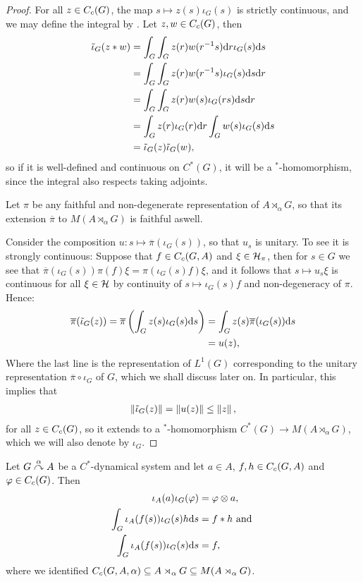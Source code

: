 \begin{proof}
For all $z \in C_c(G)$, the map $s \mapsto z(s) \iota_G(s)$ is strictly continuous, and we may define the integral by . Let $z,w \in C_c(G)$, then
\begin{align*}
	\tilde \iota_G(z \ast w) &= \int_G \int_G z(r)w(r^{-1}s) \mathrm{d} r \iota_G(s) \mathrm{d} s \\
	&= \int_G \int_G z(r) w(r^{-1}s) \iota_G(s) \mathrm{d} s \mathrm{d} r\\
	&= \int_G \int_G z(r) w(s) \iota_G(rs) \mathrm{d} s \mathrm{d} r\\
	&= \int_G z(r) \iota_G(r) \mathrm{d} r \int_G w(s) \iota_G(s) \mathrm{d} s \\
	&= \tilde \iota_G(z) \tilde \iota_G(w),
\end{align*}
so if it is well-defined and continuous on $C^*(G)$, it will be a $^*$-homomorphism, since the integral also respects taking adjoints. 

Let $\pi$ be any faithful and non-degenerate representation of $A \rtimes_\alpha G$, so that its extension $\overline \pi $ to $M(A \rtimes_ \alpha G)$ is faithful aswell.

Consider the composition $u \colon s \mapsto \overline{\pi}( \iota_G(s))$, so that $u_s$ is unitary. To see it is strongly continuous: Suppose that $f \in C_c(G,A)$ and $\xi \in \mathcal{H}_\pi$, then for $s \in G$ we see that $\overline{ \pi} (\iota_G(s)) \pi(f) \xi = \pi(\iota_G(s) f) \xi$, and it follows that  $s \mapsto u_s \xi$ is continuous for all $\xi \in \mathcal{H}$ by continuity of $s \mapsto \iota_G(s)f$ and non-degeneracy of $\pi$. Hence:
\begin{align*}
\overline \pi(\tilde \iota_G(z)) = \overline \pi \left(  \int_G z(s) \iota_G(s) \mathrm{d} s \right) &=\int_G z(s) \overline \pi(\iota_G(s)) \mathrm{d} s \\
&= u(z),
\end{align*}
Where the last line is the representation of $L^1(G)$ corresponding to the unitary representation $\overline \pi \circ \iota_G$ of $G$, which we shall discuss later on. In particular, this implies that
\begin{align}
	\left\lVert \tilde \iota_G(z)\right\rVert = \left\lVert u(z)\right\rVert \leq \left\lVert z \right\rVert,
\end{align}
for all $z \in C_c(G)$, so it extends to a $^*$-homomorphism $C^*(G) \to M(A \rtimes_\alpha G)$, which we will also denote by $\iota_G$.
\end{proof}
\begin{corollary}
Let $G \stackrel{\alpha}{\curvearrowright} A$ be a $C^*$-dynamical system and let $a \in A$, $f,h \in C_c(G,A)$ and $\varphi \in C_c(G)$. Then
\begin{align*}
\iota_A(a) \iota_G(\varphi) &= \varphi \otimes a,\\
\int_G \iota_A(f(s)) \iota_G(s)h  \mathrm{d} s &= f \ast h \text{ and }\\
\int_G \iota_A(f(s)) \iota_G(s) \mathrm{d} s & = f,
\end{align*}
where we identified $C_c(G,A,\alpha) \subseteq A \rtimes_\alpha G \subseteq M(A \rtimes_\alpha G)$.
\label{cross:iotaresults}
\end{corollary}
